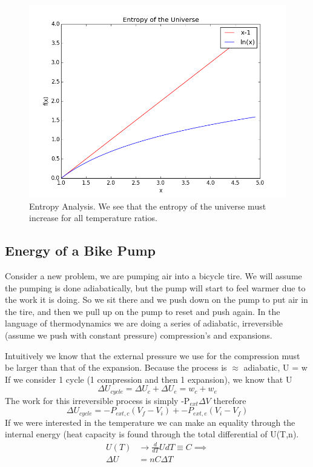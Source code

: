 \documentclass{article}
\begin{document}
\begin{figure}[H]
    \centering
    \includegraphics[width=15cm]{myfig.png}
    \caption{Entropy Analysis. We see that the entropy of the universe must increase for all temperature ratios.}
    \label{fig:entropy}
\end{figure}

\subsection*{Energy of a Bike Pump}
Consider a new problem, we are pumping air into a bicycle tire. 
We will assume the pumping is done adiabatically, but the pump will start to feel warmer due to the work it is doing. 
So we sit there and we push down on the pump to put air in the tire, and then we pull up on the pump to reset and push again.
In the language of thermodynamics we are doing a series of adiabatic, irreversible (assume we push with constant pressure) compression's and expansions. 

Intuitively we know that the external pressure we use for the compression must be larger than that of the expansion.
Because the process is $\approx$ adiabatic, U = w
If we consider 1 cycle (1 compression and then 1 expansion), we know that U
\begin{equation}
\Delta U_{cycle} = \Delta U_c + \Delta U_e = w_c + w_e
\end{equation}
The work for this irreversible process is simply -P$_{ext}\Delta V$ therefore 
\begin{equation}
\Delta U_{cycle} = -P_{ext,c}(V_f-V_i) + -P_{ext,e}(V_i-V_f)
\end{equation}
If we were interested in the temperature we can make an equality through the internal energy (heat capacity is found through the total differential of U(T,n).
\begin{equation}
\begin{split}
U(T) &\rightarrow \frac{d}{dT}U dT \equiv C \implies \\
\Delta U &= nC\Delta T
\end{split}
\end{equation}
\end{document}
